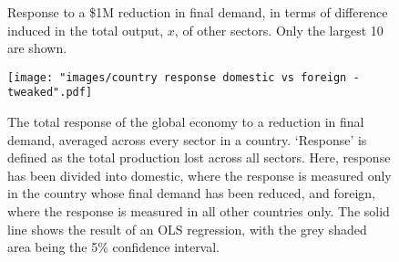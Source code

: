 \documentclass[a4paper]{article}
\begin{document}
\begin{figure}
	\centering
	\caption{Response to a \$1M reduction in final demand, in terms of difference induced in the total output, $x$, of other sectors. Only the largest 10 are shown.}
\end{figure}

\begin{figure}
\centering
\texttt{[image: "images/country response domestic vs foreign - tweaked".pdf]}
\caption{The total response of the global economy to a reduction in final demand, averaged across every sector in a country. 
`Response' is defined as the total production lost across all sectors.
Here, response has been divided into domestic, where the response is measured only in the country whose final demand has been reduced, and foreign, where the response is measured in all other countries only.
The solid line shows the result of an OLS regression, with the grey shaded area being the 5\% confidence interval.}
\label{fig:countries_domestic_vs_foreign}
\end{figure}
\end{document}
